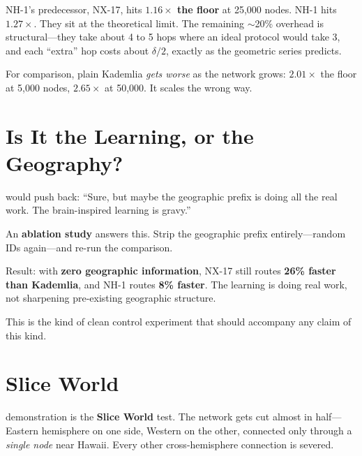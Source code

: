 \documentclass[nobib]{tufte-handout}
\begin{document}
NH-1's predecessor, NX-17, hits \textbf{$1.16\times$ the floor} at 25{,}000 nodes. NH-1 hits \textbf{$1.27\times$}. They sit at the theoretical limit. The remaining $\sim$20\% overhead is structural---they take about 4 to 5 hops where an ideal protocol would take 3, and each ``extra'' hop costs about $\delta/2$, exactly as the geometric series predicts.

For comparison, plain Kademlia \emph{gets worse} as the network grows: $2.01\times$ the floor at 5{,}000 nodes, $2.65\times$ at 50{,}000. It scales the wrong way.

\section{Is It the Learning, or the Geography?}

 would push back: ``Sure, but maybe the geographic prefix is doing all the real work. The brain-inspired learning is gravy.''

An \textbf{ablation study} answers this. Strip the geographic prefix entirely---random IDs again---and re-run the comparison.

Result: with \textbf{zero geographic information}, NX-17 still routes \textbf{26\% faster than Kademlia}, and NH-1 routes \textbf{8\% faster}. The learning is doing real work, not sharpening pre-existing geographic structure.

This is the kind of clean control experiment that should accompany any claim of this kind.

\section{Slice World}

 demonstration is the \textbf{Slice World} test. The network gets cut almost in half---Eastern hemisphere on one side, Western on the other, connected only through a \emph{single node} near Hawaii. Every other cross-hemisphere connection is severed.
\end{document}
